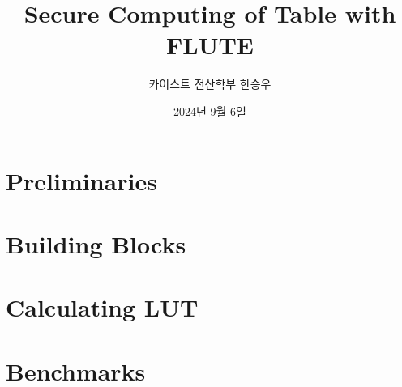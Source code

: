 \documentclass[handout]{beamer}
\title{Secure Computing of Table with FLUTE}
\author{카이스트 전산학부 한승우}
\date{2024년 9월 6일}
\begin{document}
\begin{frame}
    \titlepage
\end{frame}

\section{Preliminaries}


\section{Building Blocks}


\section{Calculating LUT}


\section{Benchmarks}


\section*{\mbox{}}

\end{document}
